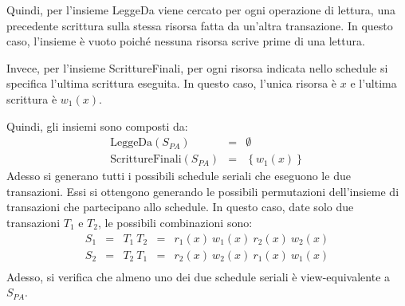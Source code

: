 \documentclass[a4paper]{article}
\begin{document}
	\noindent
	Quindi, per l'insieme LeggeDa viene cercato per ogni operazione di lettura, una precedente scrittura sulla stessa risorsa fatta da un'altra transazione. In questo caso, l'insieme è vuoto poiché nessuna risorsa scrive prime di una lettura.\newline
	
	\noindent
	Invece, per l'insieme ScrittureFinali, per ogni risorsa indicata nello schedule si specifica l'ultima scrittura eseguita. In questo caso, l'unica risorsa è $x$ e l'ultima scrittura è $w_{1}\left(x\right)$.\newline
	
	\noindent
	Quindi, gli insiemi sono composti da:
	\begin{equation*}
		\begin{array}{rll}
			\text{LeggeDa}\left(S_{PA}\right) &=& \emptyset \\
			\text{ScrittureFinali}\left(S_{PA}\right) &=& \left\{w_{1}\left(x\right)\right\}
		\end{array}
	\end{equation*}
	Adesso si generano tutti i possibili schedule seriali che eseguono le due transazioni. Essi si ottengono generando le possibili permutazioni dell'insieme di transazioni che partecipano allo schedule. In questo caso, date solo due transazioni $T_{1}$ e $T_{2}$, le possibili combinazioni sono:
	\begin{equation*}
		\begin{array}{lllll}
			S_{1} &=& T_{1} \: T_{2} &=& r_{1}\left(x\right) \: w_{1}\left(x\right) \: r_{2}\left(x\right) \: w_{2}\left(x\right) \\
			S_{2} &=& T_{2} \: T_{1} &=& r_{2}\left(x\right) \: w_{2}\left(x\right) \: r_{1}\left(x\right) \: w_{1}\left(x\right) \\
		\end{array}
	\end{equation*}
	Adesso, si verifica che almeno uno dei due schedule seriali è view-equivalente a $S_{PA}$.\newpage
	
\end{document}
